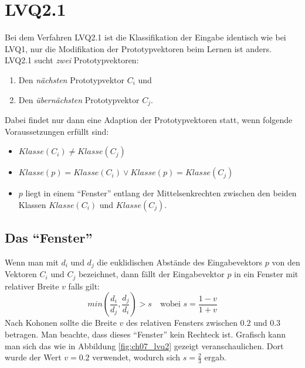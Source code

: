 \section*{LVQ2.1}
Bei dem Verfahren LVQ2.1 ist die Klassifikation der Eingabe identisch wie bei LVQ1, nur die Modifikation der Prototypvektoren beim Lernen ist anders.
LVQ2.1 sucht \emph{zwei} Prototypvektoren:
\begin{enumerate}
	\item Den \emph{nächsten} Prototypvektor $C_i$ und
	\item Den \emph{übernächsten} Prototypvektor $C_j$.
\end{enumerate}
Dabei findet nur dann eine Adaption der Prototypvektoren statt, wenn folgende Voraussetzungen erfüllt sind:
\begin{itemize}
	\item $Klasse(C_i) \ne Klasse(C_j)$
	\item $Klasse(p) = Klasse(C_i) \vee Klasse(p) = Klasse(C_j)$ 
	\item $p$ liegt in einem "`Fenster"' entlang der Mittelsenkrechten zwischen den beiden Klassen $Klasse(C_i)$ und $Klasse(C_j)$.
\end{itemize}

\subsection*{Das "`Fenster"'}
Wenn man mit $d_i$ und $d_j$ die euklidischen Abstände des Eingabevektors $p$ von den Vektoren $C_i$ und $C_j$ bezeichnet, dann fällt der Eingabevektor $p$ in ein Fenster mit relativer Breite $v$ falls gilt:
\[
	min(\frac{d_i}{d_j}, \frac{d_j}{d_i}) > s
	\quad \text{wobei } s = \frac{1-v}{1+v}
\]
Nach Kohonen sollte die Breite $v$ des relativen Fensters zwischen $0.2$ und $0.3$ betragen. Man beachte, dass dieses "`Fenster"' kein Rechteck ist.
Grafisch kann man sich das wie in Abbildung \ref{fig:ch07_lvq2} gezeigt veranschaulichen. Dort wurde der Wert $v=0.2$ verwendet, wodurch sich $s = \frac{2}{3}$ ergab.

